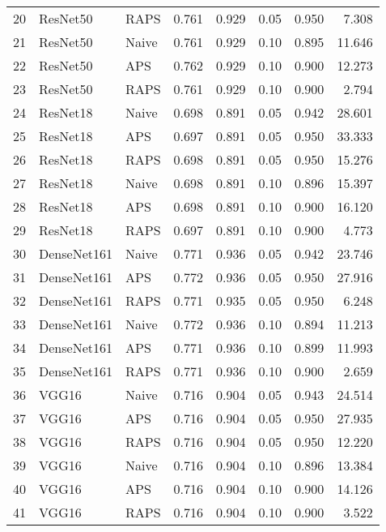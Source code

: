 \begin{tabular}{lllrrrrr}
20 &     ResNet50 &      RAPS &  0.761 &  0.929 &   0.05 &     0.950 &    7.308 \\
21 &     ResNet50 &     Naive &  0.761 &  0.929 &   0.10 &     0.895 &   11.646 \\
22 &     ResNet50 &       APS &  0.762 &  0.929 &   0.10 &     0.900 &   12.273 \\
23 &     ResNet50 &      RAPS &  0.761 &  0.929 &   0.10 &     0.900 &    2.794 \\
24 &     ResNet18 &     Naive &  0.698 &  0.891 &   0.05 &     0.942 &   28.601 \\
25 &     ResNet18 &       APS &  0.697 &  0.891 &   0.05 &     0.950 &   33.333 \\
26 &     ResNet18 &      RAPS &  0.698 &  0.891 &   0.05 &     0.950 &   15.276 \\
27 &     ResNet18 &     Naive &  0.698 &  0.891 &   0.10 &     0.896 &   15.397 \\
28 &     ResNet18 &       APS &  0.698 &  0.891 &   0.10 &     0.900 &   16.120 \\
29 &     ResNet18 &      RAPS &  0.697 &  0.891 &   0.10 &     0.900 &    4.773 \\
30 &  DenseNet161 &     Naive &  0.771 &  0.936 &   0.05 &     0.942 &   23.746 \\
31 &  DenseNet161 &       APS &  0.772 &  0.936 &   0.05 &     0.950 &   27.916 \\
32 &  DenseNet161 &      RAPS &  0.771 &  0.935 &   0.05 &     0.950 &    6.248 \\
33 &  DenseNet161 &     Naive &  0.772 &  0.936 &   0.10 &     0.894 &   11.213 \\
34 &  DenseNet161 &       APS &  0.771 &  0.936 &   0.10 &     0.899 &   11.993 \\
35 &  DenseNet161 &      RAPS &  0.771 &  0.936 &   0.10 &     0.900 &    2.659 \\
36 &        VGG16 &     Naive &  0.716 &  0.904 &   0.05 &     0.943 &   24.514 \\
37 &        VGG16 &       APS &  0.716 &  0.904 &   0.05 &     0.950 &   27.935 \\
38 &        VGG16 &      RAPS &  0.716 &  0.904 &   0.05 &     0.950 &   12.220 \\
39 &        VGG16 &     Naive &  0.716 &  0.904 &   0.10 &     0.896 &   13.384 \\
40 &        VGG16 &       APS &  0.716 &  0.904 &   0.10 &     0.900 &   14.126 \\
41 &        VGG16 &      RAPS &  0.716 &  0.904 &   0.10 &     0.900 &    3.522 \\

\end{tabular}
